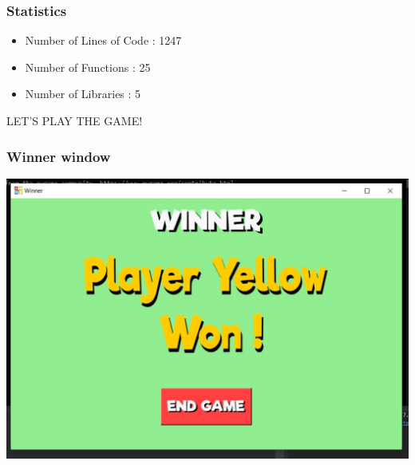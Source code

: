\documentclass[15pt]{beamer}
\begin{document}
    \begin{frame}
    \frametitle{Statistics}
        \begin{itemize}
         \item Number of Lines of Code : 1247
         \item Number of Functions : 25
	 \item Number of Libraries : 5 
        \end{itemize}
    \end{frame}
    \begin{frame}
	    \begin{center}
		    LET'S PLAY THE GAME!
	    \end{center}
    \end{frame}
    \begin{frame}
	    \frametitle{Winner window}
	    \begin{center}
	    \includegraphics[width=1\linewidth]{yellow_winner.JPEG}
	    \end{center}
    \end{frame}
\end{document}
